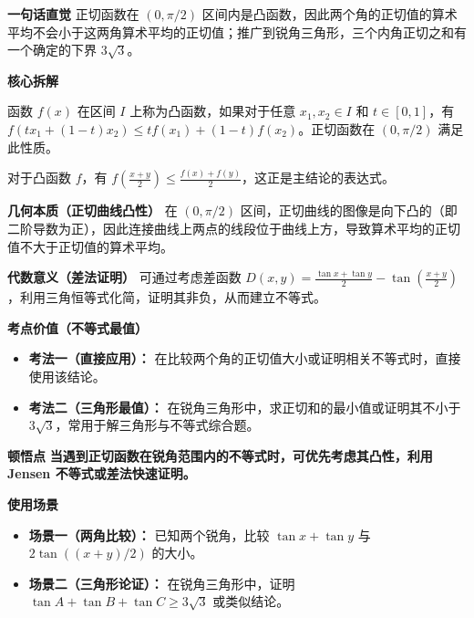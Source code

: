 \begin{explanationbox}
\textbf{\textcolor{CExplanation}{一句话直觉}}
正切函数在 $(0, \pi/2)$ 区间内是凸函数，因此两个角的正切值的算术平均不会小于这两角算术平均的正切值；推广到锐角三角形，三个内角正切之和有一个确定的下界 $3\sqrt{3}$。

\medskip
\textbf{\textcolor{CExplanation}{核心拆解}}
\begin{description}[style=nextline, leftmargin=2.8em, labelsep=0.5em, itemsep=0.45em]
    \item[\textbf{要点一（凸性定义）：}] 函数 $f(x)$ 在区间 $I$ 上称为凸函数，如果对于任意 $x_1, x_2 \in I$ 和 $t \in [0,1]$，有 $f(tx_1 + (1-t)x_2) \leq t f(x_1) + (1-t) f(x_2)$。正切函数在 $(0, \pi/2)$ 满足此性质。
    \item[\textbf{要点二（Jensen不等式）：}] 对于凸函数 $f$，有 $f\left(\frac{x+y}{2}\right) \leq \frac{f(x)+f(y)}{2}$，这正是主结论的表达式。
\end{description}

\medskip
\textbf{\textcolor{CExplanation}{几何本质（正切曲线凸性）}}
在 $(0, \pi/2)$ 区间，正切曲线的图像是向下凸的（即二阶导数为正），因此连接曲线上两点的线段位于曲线上方，导致算术平均的正切值不大于正切值的算术平均。

\medskip
\textbf{\textcolor{CExplanation}{代数意义（差法证明）}}
可通过考虑差函数 $D(x,y) = \frac{\tan x + \tan y}{2} - \tan\left(\frac{x+y}{2}\right)$，利用三角恒等式化简，证明其非负，从而建立不等式。

\medskip
\textbf{\textcolor{CExplanation}{考点价值（不等式最值）}}
\begin{itemize}[leftmargin=*, itemsep=0.5em, topsep=0.4em]
    \item \textbf{考法一（直接应用）：} 在比较两个角的正切值大小或证明相关不等式时，直接使用该结论。
    \item \textbf{考法二（三角形最值）：} 在锐角三角形中，求正切和的最小值或证明其不小于 $3\sqrt{3}$，常用于解三角形与不等式综合题。
\end{itemize}

\medskip
\textbf{\textcolor{CExplanation}{顿悟点}}
\textbf{当遇到正切函数在锐角范围内的不等式时，可优先考虑其凸性，利用 Jensen 不等式或差法快速证明。}

\medskip
\textbf{\textcolor{CExplanation}{使用场景}}
\begin{itemize}[leftmargin=*, itemsep=0.5em, topsep=0.4em]
    \item \textbf{场景一（两角比较）：} 已知两个锐角，比较 $\tan x + \tan y$ 与 $2\tan((x+y)/2)$ 的大小。
    \item \textbf{场景二（三角形论证）：} 在锐角三角形中，证明 $\tan A + \tan B + \tan C \geq 3\sqrt{3}$ 或类似结论。
\end{itemize}
\end{explanationbox}
